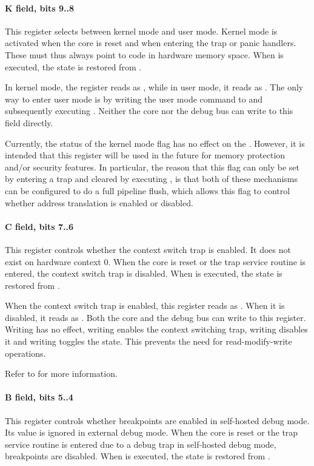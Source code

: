 \paragraph*{K field, bits 9..8}
This register selects between kernel mode and user mode. Kernel mode is
activated when the core is reset and when entering the trap or panic handlers.
These must thus always point to code in hardware memory space. When 
is executed, the state is restored from .

In kernel mode, the register reads as , while in user mode, it reads as
. The only way to enter user mode is by writing the user mode command
to  and subsequently executing . Neither the core nor the
debug bus can write to this field directly.

Currently, the status of the kernel mode flag has no effect on the \rvex{}.
However, it is intended that this register will be used in the future for memory
protection and/or security features. In particular, the reason that this flag
can only be set by entering a trap and cleared by executing , is that
both of these mechanisms can be configured to do a full pipeline flush, which
allows this flag to control whether address translation is enabled or disabled.
\paragraph*{C field, bits 7..6}
This register controls whether the context switch trap is enabled. It does not
exist on hardware context 0. When the core is reset or the trap service routine
is entered, the context switch trap is disabled. When  is executed,
the state is restored from .

When the context switch trap is enabled, this register reads as . When
it is disabled, it reads as . Both the core and the debug bus can write
to this register. Writing  has no effect, writing  enables the
context switching trap, writing  disables it and writing 
toggles the state. This prevents the need for read-modify-write operations.

Refer to  for more information.
\paragraph*{B field, bits 5..4}
This register controls whether breakpoints are enabled in self-hosted debug
mode. Its value is ignored in external debug mode. When the core is reset or the
trap service routine is entered due to a debug trap in self-hosted debug mode,
breakpoints are disabled. When  is executed, the state is restored
from .

